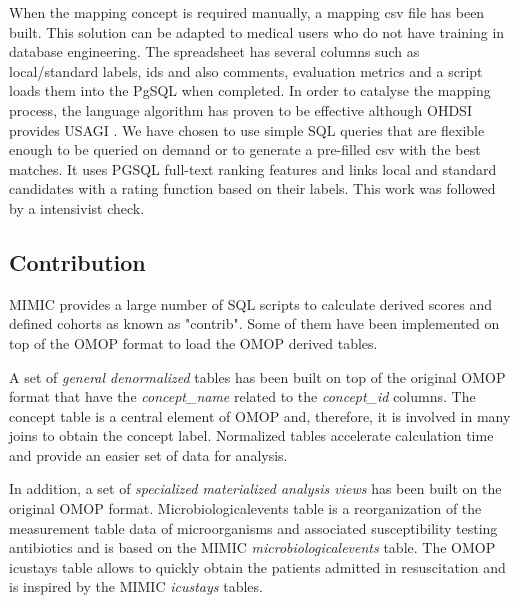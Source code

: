 When the mapping concept is required manually, a mapping csv file has been built. 
This solution can be adapted to medical users who do not have training in 
database engineering. The spreadsheet has several columns such as local/standard 
labels, ids and also comments, evaluation metrics and a script loads them into 
the PgSQL when completed. 
In order to catalyse the mapping process, the language algorithm has proven to 
be effective \cite{schema-matching} although OHDSI provides USAGI \cite{usagi}. We 
have chosen to use simple SQL queries that are flexible enough to be queried on 
demand or to generate a pre-filled csv with the best matches. It uses PGSQL 
full-text ranking features  and links local and standard candidates with a rating 
function based on their labels. This work was followed by a intensivist check.


%
%
\subsection{Contribution}

MIMIC provides a large number of SQL scripts to calculate derived scores and
defined cohorts as known as "contrib". Some of them have been implemented on
top of the OMOP format to load the OMOP derived tables. 

A set of \emph{general denormalized} tables has been built on top of the original 
OMOP  format that have the \textit{concept\_name} related to the \textit{concept\_id} 
columns. The concept table is a central element of OMOP and, therefore, it is 
involved in many joins to obtain the concept label. Normalized tables accelerate 
calculation time and provide an easier set of data for analysis.

In addition, a set of \emph{specialized materialized analysis views} has been built 
on the original OMOP format. Microbiologicalevents table is a reorganization of the 
measurement table data of microorganisms and associated susceptibility testing 
antibiotics and is based on the MIMIC \textit{microbiologicalevents} table. 
The OMOP icustays table allows to quickly obtain the patients admitted in 
resuscitation and is inspired by the MIMIC \textit{icustays} tables.

